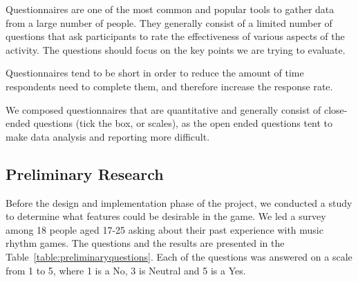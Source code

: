 Questionnaires are one of the most common and popular tools to gather data from a large number of people. They generally consist of a limited number of questions that ask participants to rate the effectiveness of various aspects of the activity. The questions should focus on the key points we are trying to evaluate. 

Questionnaires tend to be short in order to reduce the amount of time respondents need to complete them, and therefore increase the response rate. 

We composed questionnaires that are quantitative and generally consist of close-ended questions (tick the box, or scales), as the open ended questions tent to make data analysis and reporting more difficult.

\subsection*{Preliminary Research}

Before the design and implementation phase of the project, we conducted a study to determine what features could be desirable in the game. We led a survey among 18 people aged 17-25 asking about their past experience with music rhythm games. 
The questions and the results are presented in the Table~\ref{table:preliminaryquestions}. Each of the questions was answered on a scale from 1 to 5, where 1 is a No,  3 is Neutral and 5 is a Yes.

